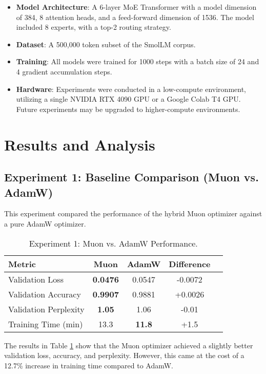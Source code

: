 \documentclass[11pt, a4paper]{article}
\begin{document}
\begin{itemize}
    \item \textbf{Model Architecture}: A 6-layer MoE Transformer with a model dimension of 384, 8 attention heads, and a feed-forward dimension of 1536. The model included 8 experts, with a top-2 routing strategy.
    \item \textbf{Dataset}: A 500,000 token subset of the SmolLM corpus.
    \item \textbf{Training}: All models were trained for 1000 steps with a batch size of 24 and 4 gradient accumulation steps.
    \item \textbf{Hardware}: Experiments were conducted in a low-compute environment, utilizing a single NVIDIA RTX 4090 GPU or a Google Colab T4 GPU. Future experiments may be upgraded to higher-compute environments.
\end{itemize}

\section{Results and Analysis}

\subsection{Experiment 1: Baseline Comparison (Muon vs. AdamW)}
This experiment compared the performance of the hybrid Muon optimizer against a pure AdamW optimizer.

\begin{table}[h!]
\centering
\caption{Experiment 1: Muon vs. AdamW Performance.}
\label{tab:exp1}
\begin{tabular}{@{}lcccc@{}}
\toprule
Metric & Muon & AdamW & Difference \\ \midrule
Validation Loss & \textbf{0.0476} & 0.0547 & -0.0072 \\
Validation Accuracy & \textbf{0.9907} & 0.9881 & +0.0026 \\
Validation Perplexity & \textbf{1.05} & 1.06 & -0.01 \\
Training Time (min) & 13.3 & \textbf{11.8} & +1.5 \\ \bottomrule
\end{tabular}
\end{table}

The results in Table \ref{tab:exp1} show that the Muon optimizer achieved a slightly better validation loss, accuracy, and perplexity. However, this came at the cost of a 12.7\% increase in training time compared to AdamW.
\end{document}
